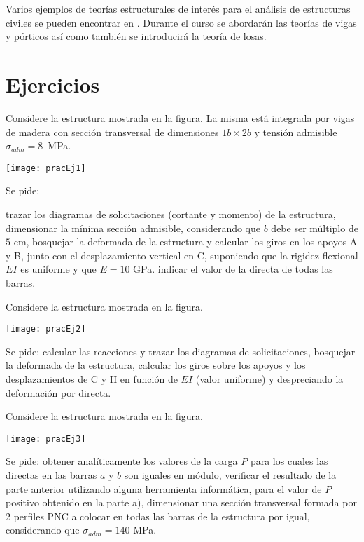 Varios ejemplos de teorías estructurales de interés para el análisis de estructuras civiles se pueden encontrar en \citep{Onate2013}. %
%
Durante el curso se abordarán las teorías de vigas y pórticos así como también se introducirá la teoría de losas.





\newpage


\section{Ejercicios}


\ejercicio
%
Considere la estructura mostrada en la figura. La misma está integrada por vigas de madera con sección transversal de dimensiones $1b \times 2 b$ y tensión admisible $\sigma_{adm} = 8$~MPa.
%
\begin{center}
\texttt{[image: pracEj1]}
\end{center}
%
\noindent
Se pide:

\parte trazar los diagramas de solicitaciones (cortante y momento) de la estructura,
%
\parte dimensionar la mínima sección admisible, considerando que $b$ debe ser múltiplo de $5$ cm,
%
\parte bosquejar la deformada de la estructura y calcular los giros en los apoyos A y B, junto con el desplazamiento vertical en C, suponiendo que la rigidez flexional $EI$ es uniforme y que $E =10$ GPa.
%
\parte indicar el valor de la directa de todas las barras.




\ejercicio
%
Considere la estructura mostrada en la figura.
%
\begin{center}
	\texttt{[image: pracEj2]}
\end{center}
%
\noindent
Se pide:
\parte calcular las reacciones y trazar los diagramas de solicitaciones,
\parte bosquejar la deformada de la estructura,
\parte calcular los giros sobre los apoyos y los desplazamientos de C y H en función de $EI$ (valor uniforme) y despreciando la deformación por directa.


\ejercicio
%
Considere la estructura mostrada en la figura.
%
\begin{center}
	\texttt{[image: pracEj3]}
\end{center}
%
\noindent
Se pide:
\parte obtener analíticamente los valores de la carga $P$ para los cuales las directas en las barras $a$ y $b$ son iguales en módulo,
%
\parte verificar el resultado de la parte anterior utilizando alguna herramienta informática,
%
\parte para el valor de $P$ positivo obtenido en la parte a), dimensionar una sección transversal formada por 2 perfiles PNC a colocar en todas las barras de la estructura por igual, considerando que $\sigma_{adm} =140$ MPa.
%


